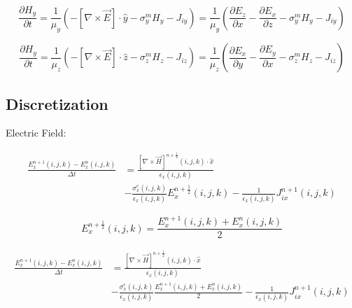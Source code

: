 \documentclass[10pt]{article}
\begin{document}
\begin{equation}
	\frac{\partial H_{y}}{\partial t} =
	\frac{1}{\mu_{y}} \left( - \left[ \nabla \times \vec{E} \right] \cdot \hat{y} - \sigma^{m}_{y} H_{y} - J_{iy} \right) =
	\frac{1}{\mu_{y}} \left( \frac{\partial E_{z}}{\partial x} - \frac{\partial E_{x}}{\partial z} - \sigma^{m}_{y} H_{y} - J_{iy} \right)
\end{equation}

\begin{equation}
	\frac{\partial H_{y}}{\partial t} =
	\frac{1}{\mu_{z}} \left( - \left[ \nabla \times \vec{E} \right] \cdot \hat{z} - \sigma^{m}_{z} H_{z} - J_{iz} \right) =
	\frac{1}{\mu_{z}} \left( \frac{\partial E_{x}}{\partial y} - \frac{\partial E_{y}}{\partial x} - \sigma^{m}_{z} H_{z} - J_{iz} \right)
\end{equation}



\subsection{Discretization}%
Electric Field:

\begin{equation}
	\begin{aligned}
		\frac{E^{n+1}_{x}(i,j,k) - E_{x}^{n}(i,j,k)}{\Delta t} & =
		\frac{\left[ \nabla \times \vec{H} \right]^{n+\frac{1}{2}}(i,j,k) \cdot \hat{x}}{\epsilon_{{x}}(i,j,k)}                                   \\
		                                                       & - \frac{\sigma^{e}_{x}(i,j,k)}{\epsilon_{x}(i,j,k)} E^{n+\frac{1}{2}}_{x}(i,j,k)
		- \frac{1}{\epsilon_{x}(i,j,k)} J^{n+1}_{ix}(i,j,k)
	\end{aligned}
\end{equation}

\begin{equation}
	E^{n+\frac{1}{2}}_{x}(i,j,k) = \frac{E^{n+1}_{x}(i,j,k)+E^{n}_{x}(i,j,k)}{2}
\end{equation}

\begin{equation}
	\begin{aligned}
		\frac{E^{n+1}_{x}(i,j,k) - E^{n}_{x}(i,j,k)}{\Delta t} & =
		\frac{\left[ \nabla \times \vec{H} \right]^{n+\frac{1}{2}}(i,j,k) \cdot \hat{x}}{\epsilon_{{x}}(i,j,k)}                                                     \\
		                                                       & - \frac{\sigma^{e}_{x}(i,j,k)}{\epsilon_{x}(i,j,k)}  \frac{E^{n+1}_{x}(i,j,k)+E^{n}_{x}(i,j,k)}{2}
		- \frac{1}{\epsilon_{x}(i,j,k)} J^{n+1}_{ix}(i,j,k)
	\end{aligned}
\end{equation}
\end{document}
